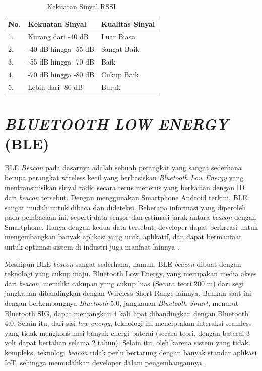 \begin{table}[H]
	\centering
	\caption{Kekuatan Sinyal RSSI \citep{VerisIndustries2013}}
	\label{t_rssi}
	\begin{tabular}{|l|l|l|}
		\hline
		\textbf{No.} & \textbf{Kekuatan Sinyal} & \textbf{Kualitas Sinyal} \\
		\hline
		1.           & Kurang dari -40 dB       & Luar Biasa               \\
		\hline
		2.           & -40 dB hingga -55 dB     & Sangat Baik              \\
		\hline
		3.           & -55 dB hingga -70 dB     & Baik                     \\
		\hline
		4.           & -70 dB hingga -80 dB     & Cukup Baik               \\
		\hline
		5.           & Lebih dari -80 dB        & Buruk                    \\
		\hline
	\end{tabular}
\end{table}

\section{\uppercase{\textit{BLUETOOTH LOW ENERGY} (BLE)}}
\par BLE \textit{Beacon} pada dasarnya adalah sebuah perangkat yang sangat sederhana berupa perangkat wireless kecil yang berbasiskan \textit{Bluetooth Low Energy} yang mentransmisikan sinyal radio secara terus menerus yang berkaitan dengan ID dari \textit{beacon} tersebut. Dengan menggunakan Smartphone Android terkini, BLE sangat mudah untuk dibaca dan dideteksi. Beberapa informasi yang diperoleh pada pembacaan ini, seperti data sensor dan estimasi jarak antara \textit{beacon} dengan Smartphone. Hanya dengan kedua data tersebut, developer dapat berkreasi untuk mengembangkan banyak aplikasi yang unik, aplikatif, dan dapat bermanfaat untuk optimasi sistem di industri juga manfaat lainnya \citep{Gupta2016}.

\par Meskipun BLE \textit{beacon} sangat sederhana, namun, BLE \textit{beacon} dibuat dengan teknologi yang cukup maju. Bluetooth Low Energy, yang merupakan media akses dari \textit{beacon}, memiliki cakupan yang cukup luas (Secara teori 200 m) dari segi jangkauan dibandingkan dengan Wireless Short Range lainnya. Bahkan saat ini dengan berkembangnya \textit{Bluetooth} 5.0, jangkauan \textit{Bluetooth Smart}, menurut Bluetooth SIG, dapat menjangkau 4 kali lipat dibandingkan dengan Bluetooth 4.0. Selain itu, dari sisi \textit{low energy}, teknologi ini menciptakan interaksi seamless yang tidak mengkonsumsi banyak energi baterai (secara teori, dengan baterai 3 volt dapat bertahan selama 2 tahun). Selain itu, oleh karena sistem yang tidak kompleks, teknologi \textit{beacon} tidak perlu bertarung dengan banyak standar aplikasi IoT, sehingga memudahkan developer dalam pengembangannya \citep{Gupta2013}.

